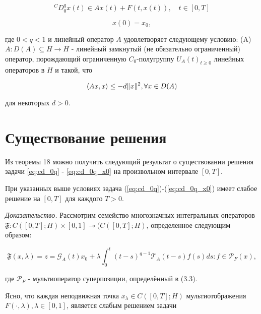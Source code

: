 \begin{equation}
    \label{eq:cd_0q}
    {}^CD_{0}^{q}x(t) \in Ax(t) + F(t, x(t)), \quad t \in [0, T]
\end{equation}

\begin{equation}
    \label{eq:cd_0q_x0}
    x(0) = x_0,
\end{equation}

\noindent где $0 < q < 1$ и линейный оператор $A$ удовлетворяет следующему условию:
(A) $A: D(A) \subseteq H \rightarrow H$ - линейный замкнутый (не обязательно ограниченный) оператор, порождающий ограниченную $C_0$-полугруппу
${U_A(t)}_{t \geq 0}$ линейных операторов в $H$ и такой, что

\begin{equation*}
    \langle Ax, x \rangle \leq -d \lVert x\rVert^2, \forall x \in D(A)
\end{equation*}

\noindent для некоторых $d > 0$.

\section{Существование решения}

Из теоремы 18 можно получить следующий результат о существовании решения задачи \ref{eq:cd_0q} - \ref{eq:cd_0q_x0} на произвольном
интервале $[0, T]$.

\begin{theorem}
    При указанных выше условиях задача (\ref{eq:cd_0q})-(\ref{eq:cd_0q_x0}) имеет слабое решение на $[0, T]$ для каждого $T > 0$.
\end{theorem}

\noindent \textit{Доказательство.} Рассмотрим семейство многозначных интегральных операторов
$\mathfrak{F}: C([0, T]; H) \times [0, 1] \multimap (C([0, T]; H)$, определенное следующим образом:

\begin{equation}
    \label{eq:F_xlambda}
    \mathfrak{F}(x, \lambda) = {z = \mathcal{G}_A (t) x_0 + \lambda \int_0^t (t-s)^{q-1} \mathcal{T}_A (t-s) f(s) ds:
    f \in \mathcal{P}_F (x)},
\end{equation}

\noindent где $\mathcal{P}_F$ - мультиоператор суперпозиции, определённый в (3.3).

Ясно, что каждая неподвижная точка $x_{\lambda} \in C([0, T]; H)$ мультиотображения $F (\cdot, \lambda), \lambda \in [0, 1]$,
является слабым решением задачи

